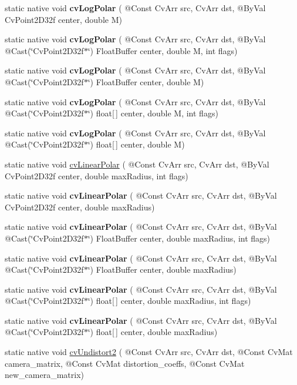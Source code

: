 \begin{DoxyCompactItemize}
static native void {\bfseries cv\+Log\+Polar} ( @Const Cv\+Arr src, Cv\+Arr dst, @By\+Val Cv\+Point2\+D32f center, double M)
\item 
static native void {\bfseries cv\+Log\+Polar} ( @Const Cv\+Arr src, Cv\+Arr dst, @By\+Val @Cast(\char`\"{}Cv\+Point2\+D32f$\ast$\char`\"{}) Float\+Buffer center, double M, int flags)
\item 
static native void {\bfseries cv\+Log\+Polar} ( @Const Cv\+Arr src, Cv\+Arr dst, @By\+Val @Cast(\char`\"{}Cv\+Point2\+D32f$\ast$\char`\"{}) Float\+Buffer center, double M)
\item 
static native void {\bfseries cv\+Log\+Polar} ( @Const Cv\+Arr src, Cv\+Arr dst, @By\+Val @Cast(\char`\"{}Cv\+Point2\+D32f$\ast$\char`\"{}) float\mbox{[}$\,$\mbox{]} center, double M, int flags)
\item 
static native void {\bfseries cv\+Log\+Polar} ( @Const Cv\+Arr src, Cv\+Arr dst, @By\+Val @Cast(\char`\"{}Cv\+Point2\+D32f$\ast$\char`\"{}) float\mbox{[}$\,$\mbox{]} center, double M)
\item 
static native void \hyperlink{group__imgproc__c_gaea7618f99d98e843a4bd01f403a4995e}{cv\+Linear\+Polar} ( @Const Cv\+Arr src, Cv\+Arr dst, @By\+Val Cv\+Point2\+D32f center, double max\+Radius, int flags)
\item 
static native void {\bfseries cv\+Linear\+Polar} ( @Const Cv\+Arr src, Cv\+Arr dst, @By\+Val Cv\+Point2\+D32f center, double max\+Radius)
\item 
static native void {\bfseries cv\+Linear\+Polar} ( @Const Cv\+Arr src, Cv\+Arr dst, @By\+Val @Cast(\char`\"{}Cv\+Point2\+D32f$\ast$\char`\"{}) Float\+Buffer center, double max\+Radius, int flags)
\item 
static native void {\bfseries cv\+Linear\+Polar} ( @Const Cv\+Arr src, Cv\+Arr dst, @By\+Val @Cast(\char`\"{}Cv\+Point2\+D32f$\ast$\char`\"{}) Float\+Buffer center, double max\+Radius)
\item 
static native void {\bfseries cv\+Linear\+Polar} ( @Const Cv\+Arr src, Cv\+Arr dst, @By\+Val @Cast(\char`\"{}Cv\+Point2\+D32f$\ast$\char`\"{}) float\mbox{[}$\,$\mbox{]} center, double max\+Radius, int flags)
\item 
static native void {\bfseries cv\+Linear\+Polar} ( @Const Cv\+Arr src, Cv\+Arr dst, @By\+Val @Cast(\char`\"{}Cv\+Point2\+D32f$\ast$\char`\"{}) float\mbox{[}$\,$\mbox{]} center, double max\+Radius)
\item 
static native void \hyperlink{group__imgproc__c_ga2b891154762834fb030334ea95ebdce9}{cv\+Undistort2} ( @Const Cv\+Arr src, Cv\+Arr dst, @Const Cv\+Mat camera\+\_\+matrix, @Const Cv\+Mat distortion\+\_\+coeffs, @Const Cv\+Mat new\+\_\+camera\+\_\+matrix)

\end{DoxyCompactItemize}
